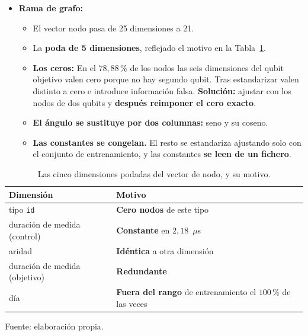 \begin{itemize}
\begin{itemize}
        \item Luego se aplicaron en este orden: una \textbf{transformación logarítmica} a todas las columnas con asimetría en modulo mayor que uno, y \textbf{escalado} (Nota: a Ranfom Rorest se aplicaron las mismas transformaciones, aunque no sirvieran, para entrenar en ambos modelo con el mismo conjunto de datos). 
    \end{itemize}
    \item \textbf{Rama de grafo:} \begin{itemize}
        \item El vector nodo pasa de 25 dimensiones a 21.
        \item La \textbf{poda de 5 dimensiones}, reflejado el motivo en la Tabla~\ref{tab:poda}.
        \item \textbf{Los ceros:} En el $78{,}88$\,\% de los nodos las seis dimensiones del qubit objetivo valen cero porque no hay segundo qubit. Tras estandarizar valen distinto a cero e introduce información falsa. \textbf{Solución:} ajustar con los nodos de dos qubits y \textbf{después reimponer el cero exacto}. 
        \item \textbf{El ángulo se sustituye por dos columnas:} seno y su coseno.
        \item \textbf{Las constantes se congelan.} El resto se estandariza ajustando solo con el conjunto de entrenamiento,
        y las constantes \textbf{se leen de un fichero}.
    \end{itemize}
\end{itemize}


\begin{table}[htbp]
    \centering
    \caption{Las cinco dimensiones podadas del vector de nodo, y su motivo.}
    \label{tab:poda}
    {\footnotesize
    \begin{tabular}{@{}lp{}@{}}
        \toprule
        \textbf{Dimensión} & \textbf{Motivo} \\
        \midrule
        tipo \texttt{id} & \textbf{Cero nodos} de este tipo \\
        duración de medida (control) & \textbf{Constante} en $2{,}18$~$\mu$s \\
        aridad & \textbf{Idéntica} a otra dimensión \\
        duración de medida (objetivo) & \textbf{Redundante}\\
        día & \textbf{Fuera del rango} de entrenamiento el $100$\,\% de las veces \\
        \bottomrule
    \end{tabular}}

    {\footnotesize Fuente: elaboración propia.}
\end{table}

